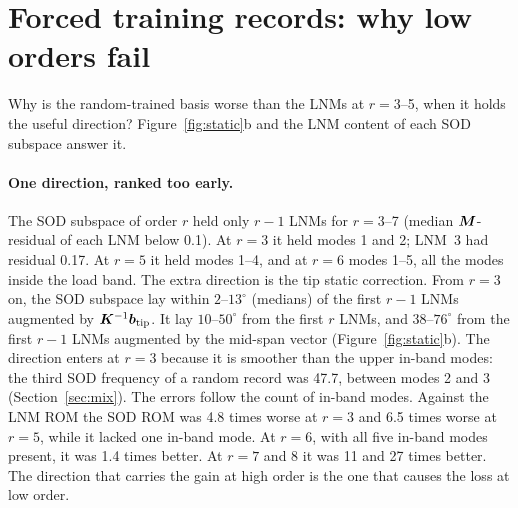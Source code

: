 \documentclass[11pt]{article}
\begin{document}
\section{Forced training records: why low orders fail}\label{sec:displace}
Why is the random-trained basis worse than the LNMs at $r=3$--5, when it holds the useful direction?
Figure~\ref{fig:static}b and the LNM content of each SOD subspace answer it.

\paragraph{One direction, ranked too early.} The SOD subspace of order $r$ held only $r-1$ LNMs for $r=3$--7 (median $\bm{M}$-residual of each LNM below 0.1). At $r=3$ it held modes 1 and 2; LNM~3 had residual 0.17. At $r=5$ it held modes 1--4, and at $r=6$ modes 1--5, all the modes inside the load band.
The extra direction is the tip static correction. From $r=3$ on, the SOD subspace lay within $2$--$13^\circ$ (medians) of the first $r-1$ LNMs augmented by $\bm{K}^{-1}\bm{b}_{\mathrm{tip}}$. It lay $10$--$50^\circ$ from the first $r$ LNMs, and $38$--$76^\circ$ from the first $r-1$ LNMs augmented by the mid-span vector (Figure~\ref{fig:static}b).
The direction enters at $r=3$ because it is smoother than the upper in-band modes: the third SOD frequency of a random record was 47.7, between modes 2 and 3 (Section~\ref{sec:mix}).
The errors follow the count of in-band modes. Against the LNM ROM the SOD ROM was 4.8 times worse at $r=3$ and 6.5 times worse at $r=5$, while it lacked one in-band mode. At $r=6$, with all five in-band modes present, it was 1.4 times better. At $r=7$ and 8 it was 11 and 27 times better.
The direction that carries the gain at high order is the one that causes the loss at low order.
\end{document}
